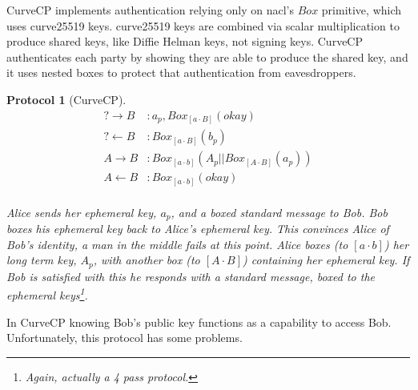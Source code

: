 \documentclass[12pt]{article}
\newtheorem{proto}{Protocol}
\begin{document}
CurveCP\cite{curvecp} implements authentication relying only on
nacl's\cite{nacl} $Box$ primitive, which uses curve25519 keys.
curve25519 keys are combined via scalar multiplication to produce
shared keys, like Diffie Helman keys\cite{ndic}, not signing keys.
CurveCP authenticates each party by showing they are able to produce
the shared key, and it uses nested boxes to protect that authentication
from eavesdroppers.

\begin{proto}[CurveCP]

  $$
  \begin{align*}
      ? \to B   &: a_{p}, Box_{[a\cdot B]}(okay) \\
      ? \gets B &: Box_{[a\cdot B]}(b_{p}) \\
      A \to B   &: Box_{[a\cdot b]}(A_p||Box_{[A \cdot B]}(a_{p}))\\
      A \gets B &: Box_{[a\cdot b]}(okay) \\
  \end{align*}
  $$

  Alice sends her ephemeral key, $a_p$, and a boxed standard message to Bob.
  Bob boxes his ephemeral key back to Alice's ephemeral key.
  This convinces Alice of Bob's identity, a man in the middle fails
  at this point. Alice boxes (to $[a\cdot b]$) her long term key, $A_p$,
  with another box (to $[A\cdot B]$) containing her ephemeral key.
  If Bob is satisfied with this he responds with a standard message,
  boxed to the ephemeral keys\footnote{
    Again, actually a 4 pass protocol.
  }.

\end{proto}

In CurveCP knowing Bob's public key functions as a capability
to access Bob. Unfortunately, this protocol has some problems.
\end{document}
